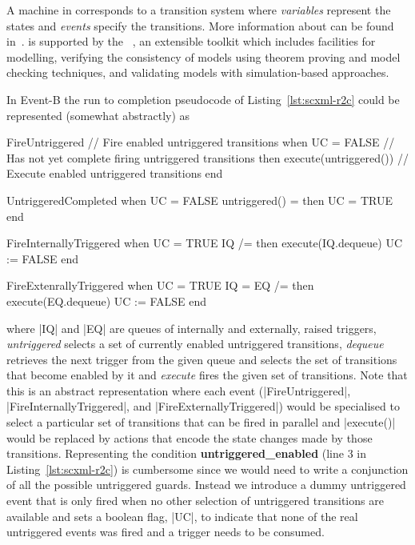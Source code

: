 A machine in \EventB corresponds to a transition system
where \emph{variables} represent the states and \emph{events} specify
the transitions.    More information about \EventB can be found in~\cite{hoang13:_introd_event_b_model_method}.  \EventB is supported by the
\Rodin~\cite{abrial10:_rodin}, an extensible toolkit which includes
facilities for modelling, verifying the consistency of models
using theorem proving and model checking techniques, and validating
models with simulation-based approaches.

In Event-B the run to completion pseudocode of Listing~\ref{lst:scxml-r2c} could be represented (somewhat abstractly) as
\begin{EventBcode}
FireUntriggered // Fire  enabled untriggered transitions
when
    UC = FALSE // Has not yet complete firing untriggered transitions
then
    execute(untriggered()) // Execute enabled untriggered transitions
end

UntriggeredCompleted
when
    UC = FALSE
    untriggered() = {}
then
    UC = TRUE
end

FireInternallyTriggered
when
    UC = TRUE
    IQ /= {}
then
    execute(IQ.dequeue)
    UC := FALSE
end

FireExtenrallyTriggered
when
    UC = TRUE
    IQ = {}
    EQ /= {}
then
    execute(EQ.dequeue)
    UC := FALSE
end
\end{EventBcode}
where |IQ| and |EQ| are queues of internally and externally, raised triggers, \emph{untriggered} selects a set of currently enabled untriggered transitions, \emph{dequeue} retrieves the next trigger from the given queue and selects the set of transitions that become enabled by it and \emph{execute} fires the given set of transitions. 
Note that this is an abstract representation where each event (|FireUntriggered|, |FireInternallyTriggered|, and |FireExternallyTriggered|) would be specialised to select a particular set of transitions that can be fired in parallel and |execute()| would be replaced by actions that encode the state changes made by those transitions.
Representing the condition \textbf{untriggered\_enabled} (line 3 in Listing~\ref{lst:scxml-r2c}) is cumbersome since we would need to write a conjunction of all the possible untriggered guards. Instead we introduce a dummy untriggered event that is only fired when no other selection of untriggered transitions are available and sets a boolean flag, |UC|, to indicate that none of the real untriggered events was fired and a trigger needs to be consumed.

